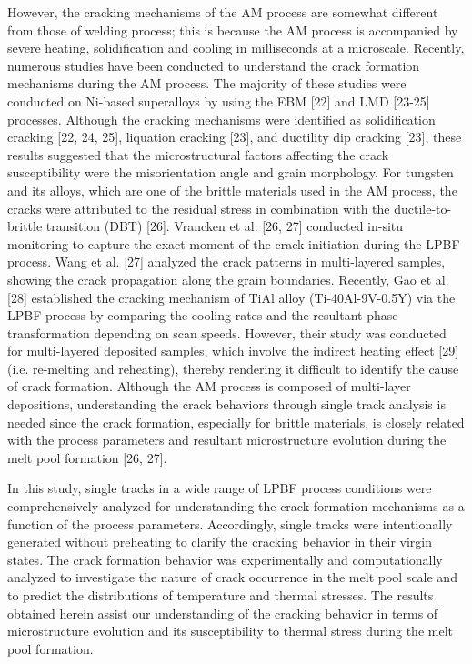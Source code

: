 \documentclass[10pt]{article}
\begin{document}
However, the cracking mechanisms of the AM process are somewhat different from those of welding process; this is because the AM process is accompanied by severe heating, solidification and cooling in milliseconds at a microscale. Recently, numerous studies have been conducted to understand the crack formation mechanisms during the AM process. The majority of these studies were conducted on Ni-based superalloys by using the EBM [22] and LMD [23-25] processes. Although the cracking mechanisms were identified as solidification cracking [22, 24, 25], liquation cracking [23], and ductility dip cracking [23], these results suggested that the microstructural factors affecting the crack susceptibility were the misorientation angle and grain morphology. For tungsten and its alloys, which are one of the brittle materials used in the AM process, the cracks were attributed to the residual stress in combination with the ductile-to-brittle transition (DBT) [26]. Vrancken et al. [26, 27] conducted in-situ monitoring to capture the exact moment of the crack initiation during the LPBF process. Wang et al. [27] analyzed the crack patterns in multi-layered samples, showing the crack propagation along the grain boundaries. Recently, Gao et al. [28] established the cracking mechanism of TiAl alloy (Ti-40Al-9V-0.5Y) via the LPBF process by comparing the cooling rates and the resultant phase transformation depending on scan speeds. However, their study was conducted for multi-layered deposited samples, which involve the indirect heating effect [29] (i.e. re-melting and reheating), thereby rendering it difficult to identify the cause of crack formation. Although the AM process is composed of multi-layer depositions, understanding the crack behaviors through single track analysis is needed since the crack formation, especially for brittle materials, is closely related with the process parameters and resultant microstructure evolution during the melt pool formation [26, 27].

In this study, single tracks in a wide range of LPBF process conditions were comprehensively analyzed for understanding the crack formation mechanisms as a function of the process parameters. Accordingly, single tracks were intentionally generated without preheating to clarify the cracking behavior in their virgin states. The crack formation behavior was experimentally and computationally analyzed to investigate the nature of crack occurrence in the melt pool scale and to predict the distributions of temperature and thermal stresses. The results obtained herein assist our understanding of the cracking behavior in terms of microstructure evolution and its susceptibility to thermal stress during the melt pool formation.
\end{document}
